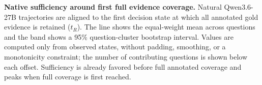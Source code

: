 \textbf{Native sufficiency around first full evidence coverage.}
Natural Qwen3.6-27B trajectories are aligned to the first decision state at which all annotated gold evidence is retained ($t_R$). The line shows the equal-weight mean across questions and the band shows a 95\% question-cluster bootstrap interval. Values are computed only from observed states, without padding, smoothing, or a monotonicity constraint; the number of contributing questions is shown below each offset. Sufficiency is already favored before full annotated coverage and peaks when full coverage is first reached.
